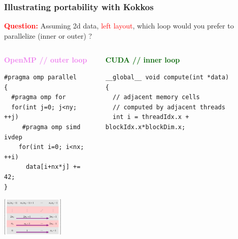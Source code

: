 \begin{frame}[fragile=singleslide]
  \frametitle{Illustrating portability with Kokkos}

  \begin{block}{}
    {\textcolor{red}{\bf Question:}
    Assuming 2d data, \textcolor{red}{left layout}, which loop would you prefer to parallelize (inner or outer) ?}
  \end{block}

  \begin{columns}
    \begin{column}{0.48\textwidth}
      \begin{center}
        \textcolor{violet}{\bf OpenMP // outer loop}

        \begin{minipage}{1.0\textwidth}
      {
        \scriptsize
        \begin{verbatim}
#pragma omp parallel
{
  #pragma omp for
  for(int j=0; j<ny; ++j)
     #pragma omp simd ivdep
    for(int i=0; i<nx; ++i)
      data[i+nx*j] += 42;
}
        \end{verbatim}
      }
      \end{minipage}
      \end{center}

      \begin{center}

        \includegraphics[width=3.0cm]{tikz/row-major-openmp}

      \end{center}
    \end{column}
    \begin{column}{0.48\textwidth}
      \begin{center}
        \textcolor{darkgreen}{\bf CUDA // inner loop}
      \end{center}
      {\tiny
        \begin{verbatim}
__global__ void compute(int *data)
{
  // adjacent memory cells
  // computed by adjacent threads
  int i = threadIdx.x + blockIdx.x*blockDim.x;


\end{verbatim}}
\end{column}
\end{columns}
\end{frame}
